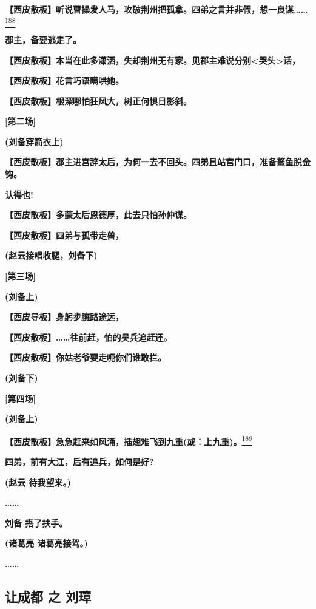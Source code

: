 \textbf{【西皮散板】听说曹操发人马，攻破荆州把孤拿。四弟之言并非假，想一良谋\ldots{}\ldots{}}\protect\hyperlink{fn188}{\textsuperscript{188}}

\textbf{郡主，备要逃走了。}

\textbf{【西皮散板】本当在此多潇洒，失却荆州无有家。见郡主难说分别\textless{}哭头\textgreater{}话，}

\textbf{【西皮散板】花言巧语瞒哄她。}

\textbf{【西皮散板】根深哪怕狂风大，树正何惧日影斜。}

\textbf{{[}第二场{]}}

\textbf{(刘备穿箭衣上)}

\textbf{【西皮散板】郡主进宫辞太后，为何一去不回头。四弟且站宫门口，准备鳌鱼脱金钩。}

\textbf{认得也!}

\textbf{【西皮散板】多蒙太后恩德厚，此去只怕孙仲谋。}

\textbf{【西皮散板】四弟与孤带走兽，}

\textbf{(赵云接唱收腿，刘备下)}

\textbf{{[}第三场{]}}

\textbf{(刘备上)}

\textbf{【西皮导板】身躬步臃路途远，}

\textbf{【西皮散板】\ldots{}\ldots{}往前赶，怕的吴兵追赶还。}

\textbf{【西皮散板】你姑老爷要走呃你们谁敢拦。}

\textbf{(刘备下)}

\textbf{{[}第四场{]}}

\textbf{(刘备上)}

\textbf{【西皮散板】急急赶来如风涌，插翅难飞到九重(或：上九重)。}\protect\hyperlink{fn189}{\textsuperscript{189}}

\textbf{四弟，前有大江，后有追兵，如何是好?}

\textbf{(赵云 待我望来。)}

\textbf{\ldots{}\ldots{}}

\textbf{刘备 搭了扶手。}

\textbf{(诸葛亮 诸葛亮接驾。)}

\textbf{\ldots{}\ldots{}}

\newpage
\hypertarget{ux8ba9ux6210ux90fd-ux4e4b-ux5218ux748b}{%
\subsection{让成都 之
刘璋}\label{ux8ba9ux6210ux90fd-ux4e4b-ux5218ux748b}}

